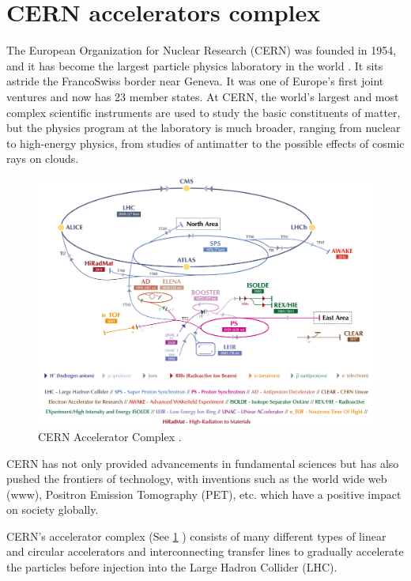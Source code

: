\pagestyle{fancy}

\graphicspath{ {Figures/Chapter1_Overview/} }

\section{CERN accelerators complex}
\label{sec:CERN_acc_complex}

The European Organization for Nuclear Research (CERN) was founded in 1954, and it has become the largest particle physics laboratory in the world \parencite*[][]{ref:CernWebsite}. It sits astride the FrancoSwiss border near Geneva. It was one of Europe's first joint ventures and now has 23 member states. At CERN, the world's largest and most complex scientific instruments are used to study the basic constituents of matter, but the physics program at the laboratory is much broader, ranging from nuclear to high-energy physics, from studies of antimatter to the possible effects of cosmic rays on clouds.

\begin{figure}[h]
    \centering
    \includegraphics[width=0.9\columnwidth]{Figure_AcceleratorChain/cernComplex.png}
    \caption{CERN Accelerator Complex \parencite*[][]{ref:cerncomplex} . }
    \label{fig:AccComplex}
\end{figure}

CERN has not only provided advancements in fundamental sciences but has also pushed the frontiers of technology, with inventions such as the world wide web (www), Positron Emission Tomography (PET), etc. which have a positive impact on society globally.

CERN's accelerator complex (See \ref{fig:AccComplex} ) consists of many different types of linear and circular accelerators and interconnecting transfer lines to gradually accelerate the particles before injection into the Large Hadron Collider (LHC). 

